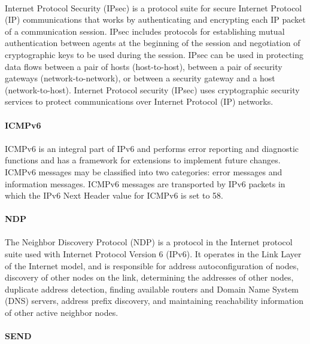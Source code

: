 \paragraph{}
Internet Protocol Security (IPsec) is a protocol suite for secure Internet Protocol (IP) communications that works by authenticating and encrypting each IP packet of a communication session. IPsec includes protocols for establishing mutual authentication between agents at the beginning of the session and negotiation of cryptographic keys to be used during the session. IPsec can be used in protecting data flows between a pair of hosts (host-to-host), between a pair of security gateways (network-to-network), or between a security gateway and a host (network-to-host). Internet Protocol security (IPsec) uses cryptographic security services to protect communications over Internet Protocol (IP) networks.

\paragraph{} \textbf{ICMPv6}
\paragraph{}
ICMPv6 is an integral part of IPv6 and performs error reporting and diagnostic functions and has a framework for extensions to implement future changes. ICMPv6 messages may be classified into two categories: error messages and information messages. ICMPv6 messages are transported by IPv6 packets in which the IPv6 Next Header value for ICMPv6 is set to 58.

\paragraph{} \textbf{NDP}
\paragraph{}
The Neighbor Discovery Protocol (NDP) is a protocol in the Internet protocol suite used with Internet Protocol Version 6 (IPv6). It operates in the Link Layer of the Internet model, and is responsible for address autoconfiguration of nodes, discovery of other nodes on the link, determining the addresses of other nodes, duplicate address detection, finding available routers and Domain Name System (DNS) servers, address prefix discovery, and maintaining reachability information of other active neighbor nodes.

\paragraph{} \textbf{SEND}
